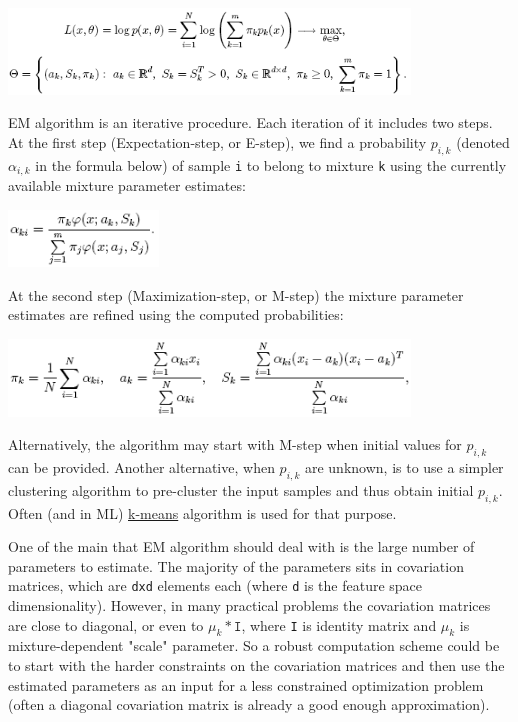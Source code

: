 \includegraphics[width=0.8\textwidth]{pics/em3.png}

EM algorithm is an iterative procedure. Each iteration of it includes
two steps. At the first step (Expectation-step, or E-step), we find a
probability $p_{i,k}$ (denoted $\alpha_{i,k}$ in the formula below) of
sample \texttt{i} to belong to mixture \texttt{k} using the currently
available mixture parameter estimates:

\includegraphics[width=0.3\textwidth]{pics/em4.png}

At the second step (Maximization-step, or M-step) the mixture parameter estimates are refined using the computed probabilities:

\includegraphics[width=0.8\textwidth]{pics/em5.png}

Alternatively, the algorithm may start with M-step when initial values for $p_{i,k}$ can be provided. Another alternative, when $p_{i,k}$ are unknown, is to use a simpler clustering algorithm to pre-cluster the input samples and thus obtain initial $p_{i,k}$. Often (and in ML) \href{CxCore#KMeans2}{k-means} algorithm is used for that purpose.

One of the main that EM algorithm should deal with is the large number of parameters to estimate. The majority of the parameters sits in covariation matrices, which are \texttt{dxd} elements each (where \texttt{d} is the feature space dimensionality). However, in many practical problems the covariation matrices are close to diagonal, or even to $\mu_k*\texttt{I}$, where \texttt{I} is identity matrix and $\mu_k$ is mixture-dependent "scale" parameter. So a robust computation scheme could be to start with the harder constraints on the covariation matrices and then use the estimated parameters as an input for a less constrained optimization problem (often a diagonal covariation matrix is already a good enough approximation).

